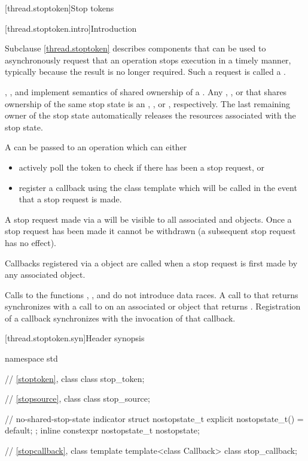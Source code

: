 [thread.stoptoken]{Stop tokens}

[thread.stoptoken.intro]{Introduction}

\pnum
Subclause \ref{thread.stoptoken} describes components that can be used
to asynchronously request that an operation stops execution in a timely manner,
typically because the result is no longer required.
Such a request is called a .

\pnum
{}, , and 
implement semantics of shared ownership of a .
Any , , or 
that shares ownership of the same stop state is an 
, , or , respectively.
The last remaining owner of the stop state automatically
releases the resources associated with the stop state.

\pnum
A  can be passed to an operation which can either
\begin{itemize}
 \item actively poll the token to check if there has been a stop request, or
 \item register a callback using the  class template which
        will be called in the event that a stop request is made.
\end{itemize}
A stop request made via a  will be visible to all
associated  and  objects.
Once a stop request has been made it cannot be withdrawn
(a subsequent stop request has no effect).

\pnum
Callbacks registered via a  object are called when
a stop request is first made by any associated  object.

\pnum
Calls to the functions , ,
and 
do not introduce data races.
A call to  that returns 
synchronizes with a call to 
on an associated  or  object
that returns .
Registration of a callback synchronizes with the invocation of that callback.


[thread.stoptoken.syn]{Header  synopsis}

%
\begin{codeblock}
namespace std {
  // \ref{stoptoken}, class 
  class stop_token;

  // \ref{stopsource}, class 
  class stop_source;

  // no-shared-stop-state indicator
  struct nostopstate_t {
    explicit nostopstate_t() = default;
  };
  inline constexpr nostopstate_t nostopstate{};

  // \ref{stopcallback}, class template 
  template<class Callback>
    class stop_callback;
}
\end{codeblock}



